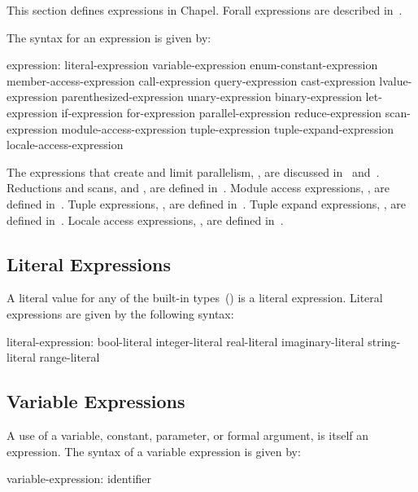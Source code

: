 \label{Expressions}

This section defines expressions in Chapel.  Forall expressions are
described in~.

The syntax for an expression is given by:
\begin{syntax}
expression:
  literal-expression
  variable-expression
  enum-constant-expression
  member-access-expression
  call-expression
  query-expression
  cast-expression
  lvalue-expression
  parenthesized-expression
  unary-expression
  binary-expression
  let-expression
  if-expression
  for-expression
  parallel-expression
  reduce-expression
  scan-expression
  module-access-expression
  tuple-expression
  tuple-expand-expression
  locale-access-expression
\end{syntax}

The expressions that create and limit
parallelism, , are discussed
in~
and~.  Reductions and
scans,  and , are
defined in~.  Module access
expressions, , are defined
in~.  Tuple
expressions, , are defined
in~.  Tuple expand
expressions, , are defined
in~.  Locale access
expressions, , are defined
in~.

\subsection{Literal Expressions}
\label{Literal_Expressions}

A literal value for any of the built-in
types~() is a literal expression.
Literal expressions are given by the following syntax:
\begin{syntax}
literal-expression:
  bool-literal
  integer-literal
  real-literal
  imaginary-literal
  string-literal
  range-literal
\end{syntax}

\subsection{Variable Expressions}
\label{Variable_Expressions}

A use of a variable, constant, parameter, or formal argument, is
itself an expression.  The syntax of a variable expression is given
by:
\begin{syntax}
variable-expression:
  identifier
\end{syntax}

